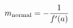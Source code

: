 \documentclass[preview]{standalone}
\begin{document}
\begin{align*}
\special{dvisvgm:raw <g id='unique000'>}m_{\text{normal}} = -\frac{1}{f'(a)}\special{dvisvgm:raw </g>}
\end{align*}
\end{document}
